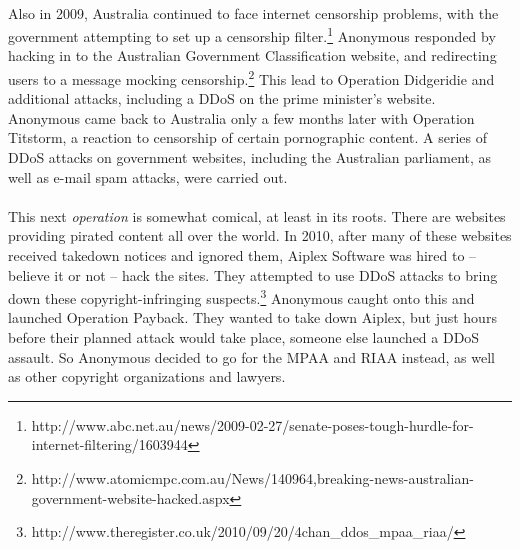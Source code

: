 \documentclass{article}
\begin{document}
\paragraph{}
Also in 2009, Australia continued to face internet censorship problems, with
the government attempting to set up a censorship filter.\footnote{
http://www.abc.net.au/news/2009-02-27/senate-poses-tough-hurdle-for-internet-filtering/1603944}
Anonymous responded by hacking in to the Australian Government Classification
website, and redirecting users to a message mocking censorship.\footnote{
http://www.atomicmpc.com.au/News/140964,breaking-news-australian-government-website-hacked.aspx}
This lead to Operation Didgeridie and additional attacks, including a DDoS on
the prime minister's website.\\
Anonymous came back to Australia only a few months later with Operation Titstorm,
a reaction to censorship of certain pornographic content. A series of DDoS 
attacks on government websites, including the Australian parliament, as well
as e-mail spam attacks, were carried out. 

\paragraph{}
This next \emph{operation} is somewhat comical, at least in its roots. There
are websites providing pirated content all over the world.  In 2010, after
many of these websites received takedown notices and ignored them, Aiplex
Software was hired to -- believe it or not -- hack the sites.  They attempted
to use DDoS attacks to bring down these copyright-infringing suspects.\footnote{
http://www.theregister.co.uk/2010/09/20/4chan\_ddos\_mpaa\_riaa/}
Anonymous caught onto this and launched Operation Payback.  They wanted to
take down Aiplex, but just hours before their planned attack would take place,
someone else launched a DDoS assault.  So Anonymous decided to go for the MPAA
and RIAA instead, as well as other copyright organizations and lawyers. 

\end{document}
